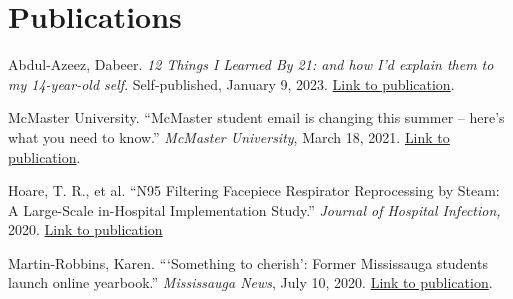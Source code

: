 \documentclass[a4paper,10pt]{article}
\begin{document}
\section{Publications}
Abdul-Azeez, Dabeer. \textit{12 Things I Learned By 21: and how I'd explain them to my 14-year-old self}. Self-published, January 9, 2023. \href{https://a.co/d/1IZYYJJ}{Link to publication}.
\vspace{8pt}

McMaster University. “McMaster student email is changing this summer – here’s what you need to know.” \textit{McMaster University}, March 18, 2021. \href{https://dailynews.mcmaster.ca/worthmentioning/mcmaster-student-email-is-changing-this-summer-heres-what-you-need-to-know/}{Link to publication}.
\vspace{8pt}

Hoare, T. R., et al. “N95 Filtering Facepiece Respirator Reprocessing by Steam: A Large-Scale in-Hospital Implementation Study.” \textit{Journal of Hospital Infection, }2020. \href{https://www.sciencedirect.com/science/article/pii/S0195670120304576#!}{Link to publication}

\vspace{8pt}

Martin-Robbins, Karen. “‘Something to cherish’: Former Mississauga students launch online yearbook.” \textit{Mississauga News}, July 10, 2020. \href{https://www.mississauga.com/community-story/10071561--something-to-cherish-former-mississauga-students-launch-online-yearbook/}{Link to publication}.



\vfill
{}
\end{document}
